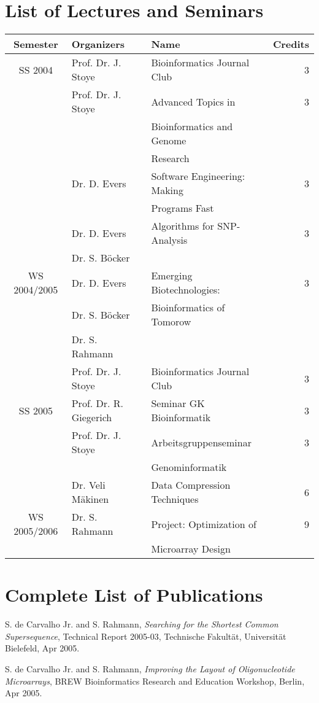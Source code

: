 \documentclass{article}
\begin{document}
\section*{List of Lectures and Seminars}

\begin{tabular}{|c|l|l|r|} \hline
Semester	& Organizers		& Name				& Credits \\ \hline \hline
SS 2004		& Prof. Dr. J. Stoye	& Bioinformatics Journal Club	& 3 	\\ \cline{2-4}
		& Prof. Dr. J. Stoye	& Advanced Topics in		& 3	\\
		&			& Bioinformatics and Genome 	&	\\
		&			& Research			&	\\ \cline{2-4}
		& Dr. D. Evers		& Software Engineering: Making	& 3	\\
		&			& Programs Fast			&	\\ \cline{2-4}
		& Dr. D. Evers		& Algorithms for SNP-Analysis	& 3	\\
		& Dr. S. B\"ocker	&				&	\\ \hline \hline
WS 2004/2005	& Dr. D. Evers		& Emerging Biotechnologies:	& 3	\\
		& Dr. S. B\"ocker	& Bioinformatics of Tomorow	&	\\
		& Dr. S. Rahmann	&				&	\\ \cline{2-4}
		& Prof. Dr. J. Stoye	& Bioinformatics Journal Club	& 3	\\ \hline \hline
SS 2005		& Prof. Dr. R. Giegerich& Seminar GK Bioinformatik	& 3	\\ \cline{2-4}
		& Prof. Dr. J. Stoye	& Arbeitsgruppenseminar		& 3	\\
		&			& Genominformatik		&	\\ \cline{2-4}
		& Dr. Veli M\"akinen	& Data Compression Techniques	& 6	\\ \hline \hline
WS 2005/2006	& Dr. S. Rahmann	& Project: Optimization of 	& 9	\\
		&			& Microarray Design		&	\\ \hline
\end{tabular}

\section*{Complete List of Publications}

\begin{description}
\item S. de Carvalho Jr. and S. Rahmann, \emph{Searching for the Shortest Common Supersequence}, Technical Report 2005-03, Technische Fakult\"at, Universit\"at Bielefeld, Apr 2005.
\item S. de Carvalho Jr. and S. Rahmann, \emph{Improving the Layout of Oligonucleotide Microarrays}, BREW Bioinformatics Research and Education Workshop, Berlin, Apr 2005.
\end{description}
\end{document}
